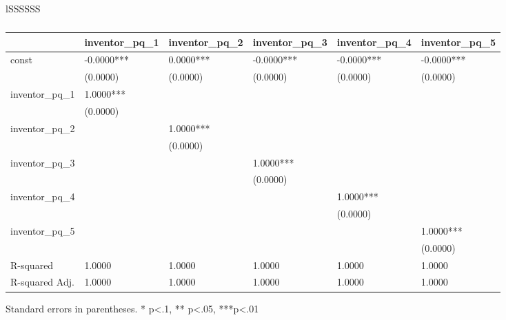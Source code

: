 \documentclass{article}
\begin{document}
\begin{table}[h]
\centering
\caption{Statistical tests for childhood exposure to innovation by parental income quintile}
\begin{tabular}{lSSSSSS}
\toprule
\begin{table}
\caption{}
\label{}
\begin{center}
\begin{tabular}{llllll}
\hline
                & inventor\_pq\_1 & inventor\_pq\_2 & inventor\_pq\_3 & inventor\_pq\_4 & inventor\_pq\_5  \\
\hline
const           & -0.0000***      & 0.0000***       & -0.0000***      & -0.0000***      & -0.0000***       \\
                & (0.0000)        & (0.0000)        & (0.0000)        & (0.0000)        & (0.0000)         \\
inventor\_pq\_1 & 1.0000***       &                 &                 &                 &                  \\
                & (0.0000)        &                 &                 &                 &                  \\
inventor\_pq\_2 &                 & 1.0000***       &                 &                 &                  \\
                &                 & (0.0000)        &                 &                 &                  \\
inventor\_pq\_3 &                 &                 & 1.0000***       &                 &                  \\
                &                 &                 & (0.0000)        &                 &                  \\
inventor\_pq\_4 &                 &                 &                 & 1.0000***       &                  \\
                &                 &                 &                 & (0.0000)        &                  \\
inventor\_pq\_5 &                 &                 &                 &                 & 1.0000***        \\
                &                 &                 &                 &                 & (0.0000)         \\
R-squared       & 1.0000          & 1.0000          & 1.0000          & 1.0000          & 1.0000           \\
R-squared Adj.  & 1.0000          & 1.0000          & 1.0000          & 1.0000          & 1.0000           \\
\hline
\end{tabular}
\end{center}
\end{table}
\bigskip
Standard errors in parentheses. \newline 
* p<.1, ** p<.05, ***p<.01\bottomrule
\end{tabular}
\end{table}
\end{document}
